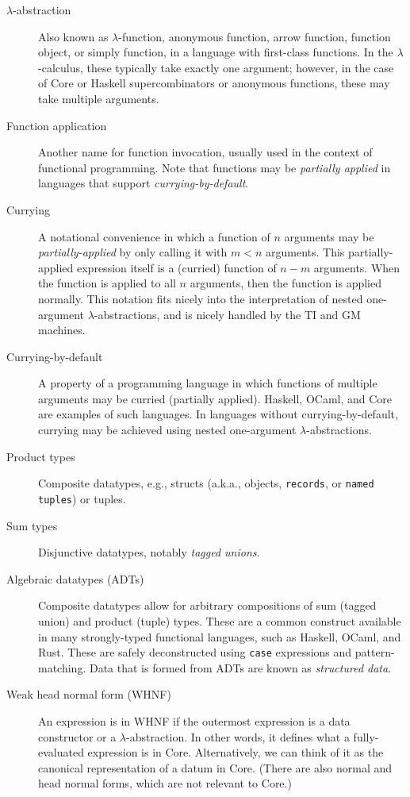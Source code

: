\begin{description}
\item[$\lambda$-abstraction] Also known as $\lambda$-function, anonymous function, arrow function, function object, or simply function, in a language with first-class functions. In the $\lambda$-calculus, these typically take exactly one argument; however, in the case of Core or Haskell supercombinators or anonymous functions, these may take multiple arguments.
\item[Function application] Another name for function invocation, usually used in the context of functional programming. Note that functions may be \textit{partially applied} in languages that support \textit{currying-by-default}.
\item[Currying] A notational convenience in which a function of $n$ arguments may be \textit{partially-applied} by only calling it with $m<n$ arguments. This partially-applied expression itself is a (curried) function of $n-m$ arguments. When the function is applied to all $n$ arguments, then the function is applied normally. This notation fits nicely into the interpretation of nested one-argument $\lambda$-abstractions, and is nicely handled by the TI and GM machines.
\item[Currying-by-default] A property of a programming language in which functions of multiple arguments may be curried (partially applied). Haskell, OCaml, and Core are examples of such languages. In languages without currying-by-default, currying may be achieved using nested one-argument $\lambda$-abstractions.
\item[Product types] Composite datatypes, e.g., structs (a.k.a., objects, \texttt{records}, or \texttt{named tuples}) or tuples.
\item[Sum types] Disjunctive datatypes, notably \textit{tagged unions}.
\item[Algebraic datatypes (ADTs)] Composite datatypes allow for arbitrary compositions of sum (tagged union) and product (tuple) types. These are a common construct available in many strongly-typed functional languages, such as Haskell, OCaml, and Rust. These are safely deconstructed using \texttt{case} expressions and pattern-matching. Data that is formed from ADTs are known as \textit{structured data}.
\item[Weak head normal form (WHNF)] An expression is in WHNF if the outermost expression is a data constructor or a $\lambda$-abstraction. In other words, it defines what a fully-evaluated expression is in Core. Alternatively, we can think of it as the canonical representation of a datum in Core. (There are also normal and head normal forms, which are not relevant to Core.)

\end{description}
